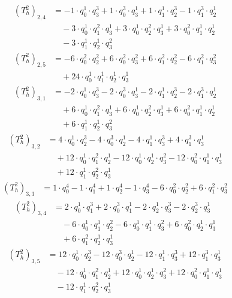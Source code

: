 \begin{align*}(T_{h}^2)_{2,4}&=-1\cdot q_0^{1}\cdot q_3^{3}+1\cdot q_0^{3}\cdot q_3^{1}+1\cdot q_1^{1}\cdot q_2^{3}-1\cdot q_1^{3}\cdot q_2^{1}\\
&\quad -3\cdot q_0^{1}\cdot q_1^{2}\cdot q_3^{1}+3\cdot q_0^{1}\cdot q_2^{2}\cdot q_3^{1}+3\cdot q_0^{2}\cdot q_1^{1}\cdot q_2^{1}\\
&\quad -3\cdot q_1^{1}\cdot q_2^{1}\cdot q_3^{2}\end{align*}
\begin{align*}(T_{h}^2)_{2,5}&=-6\cdot q_0^{2}\cdot q_2^{2}+6\cdot q_0^{2}\cdot q_3^{2}+6\cdot q_1^{2}\cdot q_2^{2}-6\cdot q_1^{2}\cdot q_3^{2}\\
&\quad +24\cdot q_0^{1}\cdot q_1^{1}\cdot q_2^{1}\cdot q_3^{1}\end{align*}
\begin{align*}(T_{h}^2)_{3,1}&=-2\cdot q_0^{1}\cdot q_3^{3}-2\cdot q_0^{3}\cdot q_3^{1}-2\cdot q_1^{1}\cdot q_2^{3}-2\cdot q_1^{3}\cdot q_2^{1}\\
&\quad +6\cdot q_0^{1}\cdot q_1^{2}\cdot q_3^{1}+6\cdot q_0^{1}\cdot q_2^{2}\cdot q_3^{1}+6\cdot q_0^{2}\cdot q_1^{1}\cdot q_2^{1}\\
&\quad +6\cdot q_1^{1}\cdot q_2^{1}\cdot q_3^{2}\end{align*}
\begin{align*}(T_{h}^2)_{3,2}&=4\cdot q_0^{1}\cdot q_2^{3}-4\cdot q_0^{3}\cdot q_2^{1}-4\cdot q_1^{1}\cdot q_3^{3}+4\cdot q_1^{3}\cdot q_3^{1}\\
&\quad +12\cdot q_0^{1}\cdot q_1^{2}\cdot q_2^{1}-12\cdot q_0^{1}\cdot q_2^{1}\cdot q_3^{2}-12\cdot q_0^{2}\cdot q_1^{1}\cdot q_3^{1}\\
&\quad +12\cdot q_1^{1}\cdot q_2^{2}\cdot q_3^{1}\end{align*}
\begin{align*}(T_{h}^2)_{3,3}&=1\cdot q_0^{4}-1\cdot q_1^{4}+1\cdot q_2^{4}-1\cdot q_3^{4}-6\cdot q_0^{2}\cdot q_2^{2}+6\cdot q_1^{2}\cdot q_3^{2}\end{align*}
\begin{align*}(T_{h}^2)_{3,4}&=2\cdot q_0^{1}\cdot q_1^{3}+2\cdot q_0^{3}\cdot q_1^{1}-2\cdot q_2^{1}\cdot q_3^{3}-2\cdot q_2^{3}\cdot q_3^{1}\\
&\quad -6\cdot q_0^{1}\cdot q_1^{1}\cdot q_2^{2}-6\cdot q_0^{1}\cdot q_1^{1}\cdot q_3^{2}+6\cdot q_0^{2}\cdot q_2^{1}\cdot q_3^{1}\\
&\quad +6\cdot q_1^{2}\cdot q_2^{1}\cdot q_3^{1}\end{align*}
\begin{align*}(T_{h}^2)_{3,5}&=12\cdot q_0^{1}\cdot q_2^{3}-12\cdot q_0^{3}\cdot q_2^{1}-12\cdot q_1^{1}\cdot q_3^{3}+12\cdot q_1^{3}\cdot q_3^{1}\\
&\quad -12\cdot q_0^{1}\cdot q_1^{2}\cdot q_2^{1}+12\cdot q_0^{1}\cdot q_2^{1}\cdot q_3^{2}+12\cdot q_0^{2}\cdot q_1^{1}\cdot q_3^{1}\\
&\quad -12\cdot q_1^{1}\cdot q_2^{2}\cdot q_3^{1}\end{align*}
